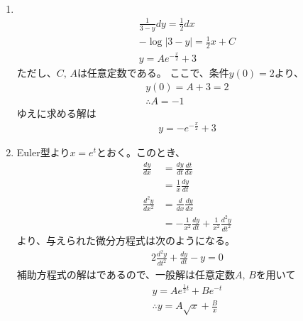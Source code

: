\begin{ans*}
  ${}$ \\
  \begin{enumerate}[label=(\alph*)]
    \item %
    ${}$
    \begin{gather}
      \frac{1}{3-y}dy = \frac{1}{2}dx \\
      -\log|3-y| = \frac{1}{2}x + C \\
      y = Ae^{-\frac{x}{2}} + 3
    \end{gather}
    ただし、$C,\,A$は任意定数である。
    ここで、条件$y(0) = 2$より、
    \begin{gather}
      y(0) = A + 3 = 2 \\
      \therefore  A = -1
    \end{gather}
    ゆえに求める解は
    \begin{gather}
      y = -e^{-\frac{x}{2}} + 3
    \end{gather}
    \item Euler型より$x = e^t$とおく。このとき、
    \begin{align}
      \frac{dy}{dx}
        &= \frac{dy}{dt}\frac{dt}{dx} \\
        &= \frac{1}{x}\frac{dy}{dt} \\
      \frac{d^2y}{dx^2}
        &= \frac{d}{dx}\frac{dy}{dx} \\
        &= -\frac{1}{x^2}\frac{dy}{dt} + \frac{1}{x^2}\frac{d^2y}{dt^2}
    \end{align}
    より、与えられた微分方程式は次のようになる。
    \begin{align}
      2\frac{d^2y}{dt^2} + \frac{dy}{dt} - y = 0
    \end{align}
    補助方程式の解はであるので、一般解は任意定数$A,\,B$を用いて
    \begin{gather}
      y = Ae^{\frac{1}{2}t} + Be^{-t} \\
      \therefore y = A\sqrt{x} + \frac{B}{x}
    \end{gather}
  \end{enumerate}
\end{ans*}


